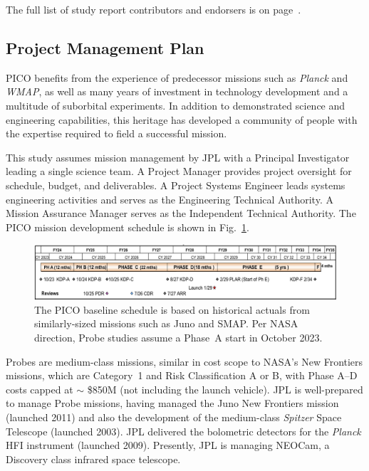 The full list of study report contributors and endorsers is on page~\pageref{authorlist}.

\subsection{Project Management Plan}
\label{sec:management_plan} %

PICO benefits from the experience of predecessor missions such as
\textit{Planck} and \textit{WMAP}, as well as many years of investment
in technology development and a multitude of suborbital
experiments. In addition to demonstrated science and engineering
capabilities, this heritage has developed a community of people with
the expertise required to field a successful mission.

This study assumes mission management by JPL with a Principal
Investigator leading a single science team. A Project Manager provides
project oversight for schedule, budget, and deliverables. A Project
Systems Engineer leads systems engineering activities and serves as
the Engineering Technical Authority. A Mission Assurance Manager
serves as the Independent Technical Authority. The PICO mission
development schedule is shown in Fig.~\ref{fig:Schedule}.

\begin{figure}[hb]
\begin{center}
\includegraphics[width=\textwidth]{figures/Schedule.png}
\caption{\captiontext 
  The PICO baseline schedule is based on historical actuals
  from similarly-sized missions such as Juno and
  SMAP. Per NASA direction, Probe studies assume a Phase~A start in October 2023.\label{fig:Schedule}}
\end{center}
\end{figure}

Probes are medium-class missions, similar in cost scope to NASA's
New Frontiers missions, which are Category~1 and Risk Classification A
or B, with Phase A--D costs capped at $\sim$ \$850M (not including the
launch vehicle). JPL is well-prepared to manage Probe missions, having
managed the Juno New Frontiers mission (launched 2011) and also the
development of the medium-class \textit{Spitzer} Space Telescope (launched
2003). JPL delivered the bolometric detectors for the \textit{Planck}
HFI instrument (launched 2009). Presently, JPL is managing NEOCam, a
Discovery class infrared space telescope.

